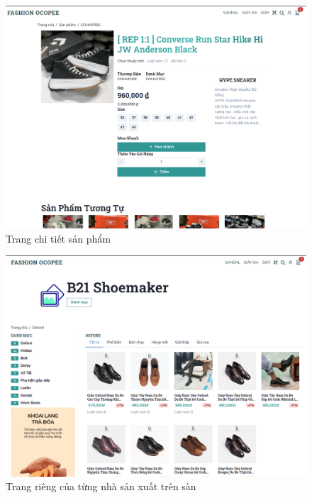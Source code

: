 \begin{figure}[!htbp]
	\begin{center}	
		\includegraphics[width=\textwidth]{./results/product-page}
		\caption{Trang chi tiết sản phẩm}
	\end{center}
\end{figure}
\clearpage
\FloatBarrier
\begin{figure}[!htbp]
	\begin{center}	
		\includegraphics[width=\textwidth]{./results/store-page}
		\caption{Trang riêng của từng nhà sản xuất trên sàn}
	\end{center}
\end{figure}